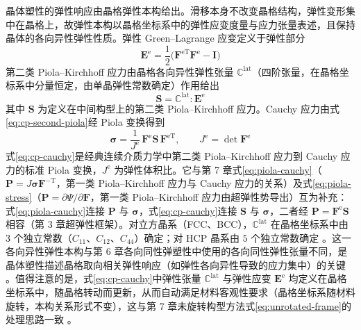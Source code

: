 晶体塑性的弹性响应由晶格弹性本构给出。滑移本身不改变晶格结构，弹性变形集中在晶格上，故弹性本构以晶格坐标系中的弹性应变度量与应力张量表述，且保持晶体的各向异性弹性性质。弹性 Green--Lagrange 应变定义于弹性部分
\begin{equation}
  \mathbf{E}^{\mathrm{e}}=\frac{1}{2}\bigl(\mathbf{F}^{\mathrm{eT}}\mathbf{F}^{\mathrm{e}}-\mathbf{I}\bigr)
  \label{eq:cp-green-lagrange}
\end{equation}
第二类 Piola--Kirchhoff 应力由晶格各向异性弹性张量 $\mathbb{C}^{\mathrm{lat}}$（四阶张量，在晶格坐标系中分量恒定，由单晶弹性常数确定）作用给出
\begin{equation}
  \mathbf{S}=\mathbb{C}^{\mathrm{lat}}:\mathbf{E}^{\mathrm{e}}
  \label{eq:cp-second-piola}
\end{equation}
其中 $\mathbf{S}$ 为定义在中间构型上的第二类 Piola--Kirchhoff 应力。Cauchy 应力由式\eqref{eq:cp-second-piola}经 Piola 变换得到
\begin{equation}
  \boldsymbol{\sigma}=\frac{1}{J^{\mathrm{e}}}\,\mathbf{F}^{\mathrm{e}}\mathbf{S}\,\mathbf{F}^{\mathrm{eT}},\qquad
  J^{\mathrm{e}}=\det\mathbf{F}^{\mathrm{e}}
  \label{eq:cp-cauchy}
\end{equation}
式\eqref{eq:cp-cauchy}是经典连续介质力学中第二类 Piola--Kirchhoff 应力到 Cauchy 应力的标准 Piola 变换，$J^{\mathrm{e}}$ 为弹性体积比。它与第 7 章式\eqref{eq:piola-cauchy}（$\mathbf{P}=J\boldsymbol{\sigma}\mathbf{F}^{-\mathrm{T}}$，第一类 Piola--Kirchhoff 应力与 Cauchy 应力的关系）及式\eqref{eq:piola-stress}（$\mathbf{P}=\partial\Psi/\partial\mathbf{F}$，第一类 Piola--Kirchhoff 应力由超弹性势导出）互为补充：式\eqref{eq:piola-cauchy}连接 $\mathbf{P}$ 与 $\boldsymbol{\sigma}$，式\eqref{eq:cp-cauchy}连接 $\mathbf{S}$ 与 $\boldsymbol{\sigma}$，二者经 $\mathbf{P}=\mathbf{F}^{\mathrm{e}}\mathbf{S}$ 相容（第 3 章超弹性框架）。对立方晶系（FCC、BCC），$\mathbb{C}^{\mathrm{lat}}$ 在晶格坐标系中由 $3$ 个独立常数（$C_{11}$、$C_{12}$、$C_{44}$）确定；对 HCP 晶系由 $5$ 个独立常数确定 \cite{Roters2010}。这一各向异性弹性本构与第 6 章各向同性弹塑性中使用的各向同性弹性张量不同，是晶体塑性描述晶格取向相关弹性响应（如弹性各向异性导致的应力集中）的关键 \cite{Asaro1983,Rice1971}。值得注意的是，式\eqref{eq:cp-cauchy}中弹性张量 $\mathbb{C}^{\mathrm{lat}}$ 与弹性应变 $\mathbf{E}^{\mathrm{e}}$ 均定义在晶格坐标系中，随晶格转动而更新，从而自动满足材料客观性要求（晶格坐标系随材料旋转，本构关系形式不变），这与第 7 章未旋转构型方法式\eqref{eq:unrotated-frame}的处理思路一致 \cite{Asaro1983}。

